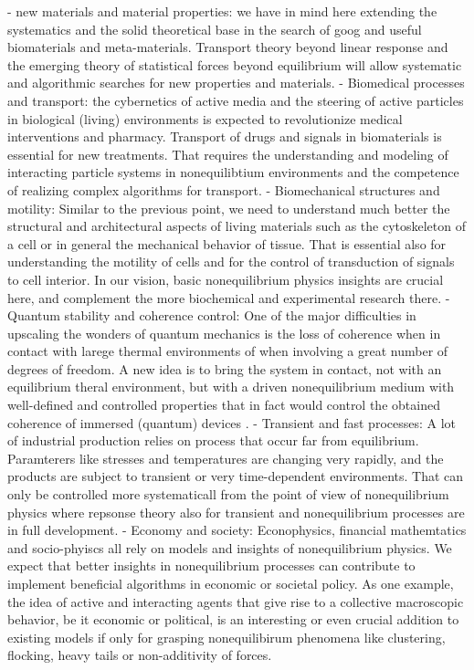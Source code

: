 - new materials and material properties: we have in mind here extending the systematics and the solid theoretical base in the search of goog and useful biomaterials and meta-materials.  Transport theory beyond linear response and the emerging theory of statistical forces beyond equilibrium will allow systematic and algorithmic searches for new properties and materials.
- Biomedical processes and transport:  the cybernetics of active media and the steering of active particles in biological (living) environments is expected to revolutionize medical interventions and pharmacy.  Transport of drugs and signals in biomaterials is essential for new treatments.  That requires the understanding and modeling of interacting particle systems in nonequilibtium environments and the competence of realizing complex algorithms for transport.
- Biomechanical structures and motility: Similar to the previous point, we need to understand much better the structural and architectural aspects of living materials such as the cytoskeleton of a cell or in general the mechanical behavior of tissue.  That is essential also for understanding the motility of cells and for the control of transduction of signals to cell interior.  In our vision, basic nonequilibrium physics insights are crucial here, and complement the more biochemical and experimental research there.
- Quantum stability and coherence control: One of the major difficulties in upscaling the wonders of quantum mechanics is the loss of coherence when in contact with larege thermal environments of when involving a great number of degrees of freedom.  A new idea is to bring the system in contact, not with an equilibrium theral environment, but with a driven nonequilibrium medium with well-defined and controlled properties that in fact would control the obtained coherence of immersed (quantum) devices .
- Transient and fast processes: A lot of industrial production relies on process that occur far from equilibrium.  Paramterers like stresses and temperatures are changing very rapidly, and the products are subject to transient or very time-dependent environments. That can only be controlled more systematicall from the point of view of nonequilibrium physics where repsonse theory also for transient and nonequilibrium processes are in full development.
- Economy and society:  Econophysics, financial mathemtatics and socio-phyiscs all rely on models and insights of nonequilibrium physics. We expect that better insights in nonequilibrium processes can contribute to implement beneficial algorithms in economic or societal policy.  As one example, the idea of active and interacting agents that give rise to a collective macroscopic behavior, be it economic or political, is an interesting or even crucial addition to existing models if only for grasping nonequilibirum phenomena like clustering, flocking, heavy tails or non-additivity of forces.
